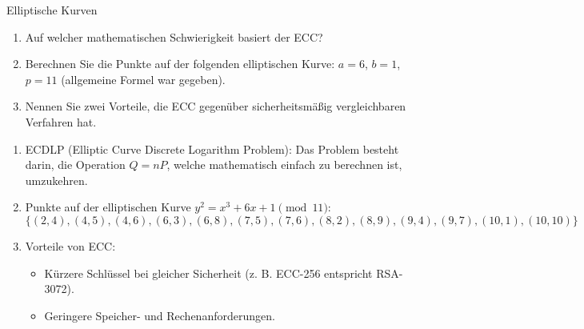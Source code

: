 \documentclass{article}
\begin{document}
\begin{exercise}{Elliptische Kurven}
  \begin{enumerate}
    \item Auf welcher mathematischen Schwierigkeit basiert der ECC?
    \item Berechnen Sie die Punkte auf der folgenden elliptischen Kurve: $a = 6$, $b = 1$, $p = 11$ (allgemeine Formel war gegeben).
    \item Nennen Sie zwei Vorteile, die ECC gegenüber sicherheitsmäßig vergleichbaren Verfahren hat.
  \end{enumerate}

  \begin{solution}
    \begin{enumerate}
        \item ECDLP (Elliptic Curve Discrete Logarithm Problem): Das Problem besteht darin, die Operation $Q=nP$, welche mathematisch einfach zu berechnen ist, umzukehren.
        \item Punkte auf der elliptischen Kurve $y^2 = x^3 + 6x + 1 \pmod{11}$:
          \[ \{(2,4), (4,5), (4,6), (6,3), (6,8), (7,5), (7,6), (8,2), (8,9), (9,4), (9,7), (10,1), (10,10)\} \]
        \item Vorteile von ECC:
          \begin{itemize}
              \item Kürzere Schlüssel bei gleicher Sicherheit (z. B. ECC-256 entspricht RSA-3072).
              \item Geringere Speicher- und Rechenanforderungen.
          \end{itemize}
    \end{enumerate}
  \end{solution}
\end{exercise}
\end{document}
